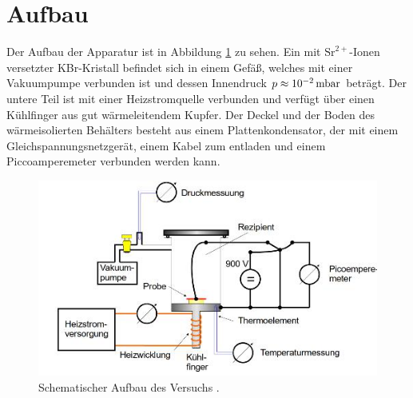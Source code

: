 \section{Aufbau}
\label{sec:Aufbau}

Der Aufbau der Apparatur ist in Abbildung \ref{fig:Aufbau} zu sehen.
Ein mit $\mathrm{Sr}^{2+}$-Ionen versetzter KBr-Kristall befindet sich in einem Gefäß, welches mit einer Vakuumpumpe verbunden ist und dessen Innendruck $p\approx\SI{E-2}{\milli\bar}$ beträgt. Der untere Teil ist mit einer Heizstromquelle verbunden und verfügt über einen Kühlfinger aus gut wärmeleitendem Kupfer.
Der Deckel und der Boden des wärmeisolierten Behälters besteht aus einem Plattenkondensator, der mit einem Gleichspannungsnetzgerät, einem Kabel zum entladen und einem Piccoamperemeter verbunden werden kann.

\begin{figure}
	\centering
	\includegraphics[width=\linewidth-70pt,height=\textheight-70pt,keepaspectratio]{content/images/Aufbau.jpg}
	\caption{Schematischer Aufbau des Versuchs \cite{V23}.}
	\label{fig:Aufbau}
\end{figure}
